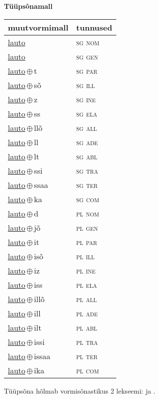 

\vspace{3.5em}
\noindent \begin{minipage}{\textwidth}
\noindent \textbf{Tüüpsõnamall \,}\\

\begin{sideways}
\begin{tabular}{l l}
muutvormimall & tunnused \\
\hline
\underline{lauto} & \textsc{ sg nom } \\
\underline{lauto} & \textsc{ sg gen } \\
\underline{lauto}\,$\oplus$\,t & \textsc{ sg par } \\
\underline{lauto}\,$\oplus$\,sõ & \textsc{ sg ill } \\
\underline{lauto}\,$\oplus$\,z & \textsc{ sg ine } \\
\underline{lauto}\,$\oplus$\,ss & \textsc{ sg ela } \\
\underline{lauto}\,$\oplus$\,llõ & \textsc{ sg all } \\
\underline{lauto}\,$\oplus$\,ll & \textsc{ sg ade } \\
\underline{lauto}\,$\oplus$\,lt & \textsc{ sg abl } \\
\underline{lauto}\,$\oplus$\,ssi & \textsc{ sg tra } \\
\underline{lauto}\,$\oplus$\,ssaa & \textsc{ sg ter } \\
\underline{lauto}\,$\oplus$\,ka & \textsc{ sg com } \\
\underline{lauto}\,$\oplus$\,d & \textsc{ pl nom } \\
\underline{lauto}\,$\oplus$\,jõ & \textsc{ pl gen } \\
\underline{lauto}\,$\oplus$\,it & \textsc{ pl par } \\
\underline{lauto}\,$\oplus$\,isõ & \textsc{ pl ill } \\
\underline{lauto}\,$\oplus$\,iz & \textsc{ pl ine } \\
\underline{lauto}\,$\oplus$\,iss & \textsc{ pl ela } \\
\underline{lauto}\,$\oplus$\,illõ & \textsc{ pl all } \\
\underline{lauto}\,$\oplus$\,ill & \textsc{ pl ade } \\
\underline{lauto}\,$\oplus$\,ilt & \textsc{ pl abl } \\
\underline{lauto}\,$\oplus$\,issi & \textsc{ pl tra } \\
\underline{lauto}\,$\oplus$\,issaa & \textsc{ pl ter } \\
\underline{lauto}\,$\oplus$\,ika & \textsc{ pl com } \\
\end{tabular}
\end{sideways}
\label{tab:tüüpsõnamall-lauto}

\end{minipage}

 
\vspace{1em}
\noindent Tüüpsõna hõlmab vormisõnastikus 2 lekseemi:  ja .
